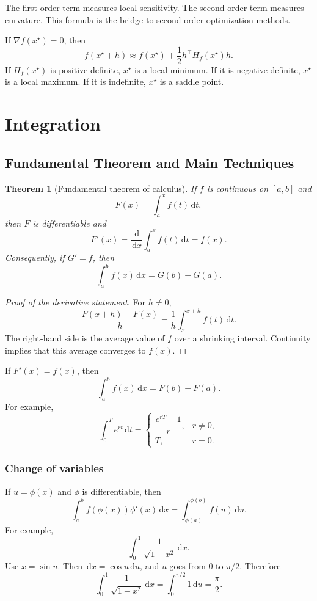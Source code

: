 \documentclass[11pt]{article}
\newcommand{\dd}{\,\mathrm{d}}
\theoremstyle{definition}
\theoremstyle{plain}
\newtheorem{theorem}[definition]{Theorem}
\theoremstyle{remark}
\begin{document}
The first-order term measures local sensitivity. The second-order term measures
curvature. This formula is the bridge to second-order optimization methods.

If $\nabla f(x^\star)=0$, then
\[
f(x^\star+h)\approx f(x^\star)+\frac{1}{2}h^\top H_f(x^\star)h.
\]
If $H_f(x^\star)$ is positive definite, $x^\star$ is a local minimum. If it is
negative definite, $x^\star$ is a local maximum. If it is indefinite,
$x^\star$ is a saddle point.

\section{Integration}

\subsection{Fundamental Theorem and Main Techniques}

\begin{theorem}[Fundamental theorem of calculus]
If $f$ is continuous on $[a,b]$ and
\[
F(x)=\int_a^x f(t)\dd t,
\]
then $F$ is differentiable and
\[
\boxed{F'(x)=\frac{\dd}{\dd x}\int_a^x f(t)\dd t=f(x).}
\]
Consequently, if $G'=f$, then
\[
\boxed{\int_a^bf(x)\dd x=G(b)-G(a).}
\]
\end{theorem}

\begin{proof}[Proof of the derivative statement]
For $h\neq0$,
\[
\frac{F(x+h)-F(x)}{h}=\frac1h\int_x^{x+h}f(t)\dd t.
\]
The right-hand side is the average value of $f$ over a shrinking interval.
Continuity implies that this average converges to $f(x)$.
\end{proof}

If $F'(x)=f(x)$, then
\[
\int_a^b f(x)\dd x=F(b)-F(a).
\]
For example,
\[
\int_0^T e^{rt}\dd t=
\begin{cases}
\dfrac{e^{rT}-1}{r},& r\neq0,\\
T,& r=0.
\end{cases}
\]

\subsubsection*{Change of variables}

If $u=\phi(x)$ and $\phi$ is differentiable, then
\[
\int_a^b f(\phi(x))\phi'(x)\dd x
=
\int_{\phi(a)}^{\phi(b)}f(u)\dd u.
\]
For example,
\[
\int_0^1\frac{1}{\sqrt{1-x^2}}\dd x.
\]
Use $x=\sin u$. Then $\dd x=\cos u\dd u$, and $u$ goes from $0$ to $\pi/2$.
Therefore
\[
\int_0^1\frac{1}{\sqrt{1-x^2}}\dd x
=
\int_0^{\pi/2}1\dd u
=\frac{\pi}{2}.
\]
\end{document}
